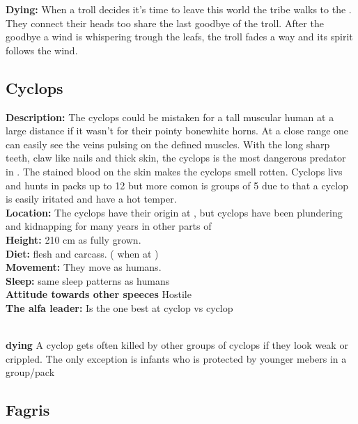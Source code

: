 \documentclass{article}
\begin{document}
\textbf{Dying: } When a troll decides it's time to leave this world the tribe walks to the . They connect their heads too share the last goodbye of the troll. After the goodbye a wind is whispering trough the leafs, the troll fades a way and its spirit follows the wind.




\subsection{Cyclops}
\label{cyclops}

\textbf{Description:} The cyclops could be mistaken for a tall muscular human at a large distance if it wasn't for their pointy bonewhite horns. At a close range one can easily see the veins pulsing on the defined muscles. With the long sharp teeth, claw like nails and thick skin, the cyclops is the most dangerous predator in . The stained blood on the skin makes the cyclops smell rotten. Cyclops livs and hunts in packs up to 12 but more comon is groups of 5 due to that a cyclop is easily iritated and have a hot temper.    
\\\textbf{Location:} The cyclops have their origin at , but cyclops have been plundering and kidnapping for many years in other parts of 
\\\textbf{Height:} 210 cm as fully grown.
\\\textbf{Diet:} flesh and carcass. ( when at )
\\\textbf{Movement: } They move as humans.
\\\textbf{Sleep: } same sleep patterns as humans
\\\textbf{Attitude towards other speeces} Hostile
\\\textbf{The alfa leader:} Is the one best at cyclop vs cyclop

\\\textbf{dying} A cyclop gets often killed by other groups of cyclops if they look weak or crippled. The only exception is infants who is protected by younger mebers in a group/pack
\subsection{Fagris}
\label{lizard}
\end{document}
